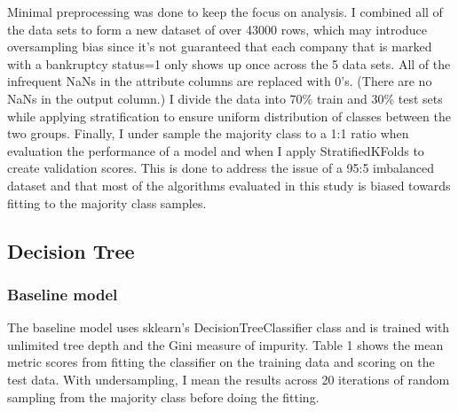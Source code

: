 \documentclass{article}
\begin{document}
Minimal preprocessing was done to keep the focus on analysis. I combined all of the data sets to form a new dataset of over 43000 rows, which may introduce oversampling bias since it's not guaranteed that each company that is marked with a bankruptcy status=1 only shows up once across the 5 data sets. All of the infrequent NaNs in the attribute columns are replaced with 0's. (There are no NaNs in the output column.) I divide the data into 70\% train and 30\% test sets while applying stratification to ensure uniform distribution of classes between the two groups. Finally, I under sample the majority class to a 1:1 ratio when evaluation the performance of a model and when I apply StratifiedKFolds to create validation scores. This is done to address the issue of a 95:5 imbalanced dataset and that most of the algorithms evaluated in this study is biased towards fitting to the majority class samples.


\subsection{Decision Tree}

\subsubsection*{Baseline model}

The baseline model uses sklearn's DecisionTreeClassifier class and is trained with unlimited tree depth and the Gini measure of impurity. Table 1 shows the mean metric scores from fitting the classifier on the training data and scoring on the test data. With undersampling, I mean the results across 20 iterations of random sampling from the majority class before doing the fitting.
\end{document}
